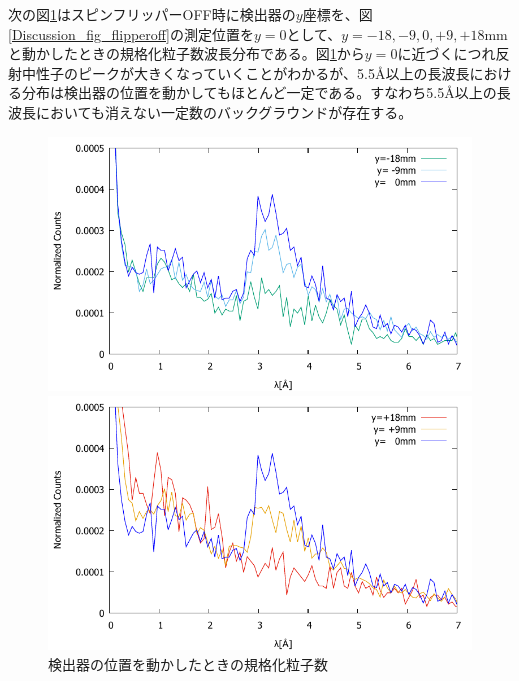 次の図\ref{Discussion_fig_detectormove}はスピンフリッパーOFF時に検出器の$y$座標を、図\ref{Discussion_fig_flipperoff}の測定位置を$y=0$として、$y=-18, -9, 0, +9, +18$mmと動かしたときの規格化粒子数波長分布である。図\ref{Discussion_fig_detectormove}から$y=0$に近づくにつれ反射中性子のピークが大きくなっていくことがわかるが、5.5\AA 以上の長波長における分布は検出器の位置を動かしてもほとんど一定である。すなわち5.5\AA 以上の長波長においても消えない一定数のバックグラウンドが存在する。
\begin{figure}[h]
\begin{minipage}{0.5\hsize}
\centering
\includegraphics[width=\hsize]{discussion/BG/flippermove1.pdf}
\end{minipage}
\begin{minipage}{0.5\hsize}
\centering
\includegraphics[width=\hsize]{discussion/BG/flippermove2.pdf}
\end{minipage}
\caption{検出器の位置を動かしたときの規格化粒子数}\label{Discussion_fig_detectormove}
\end{figure}

